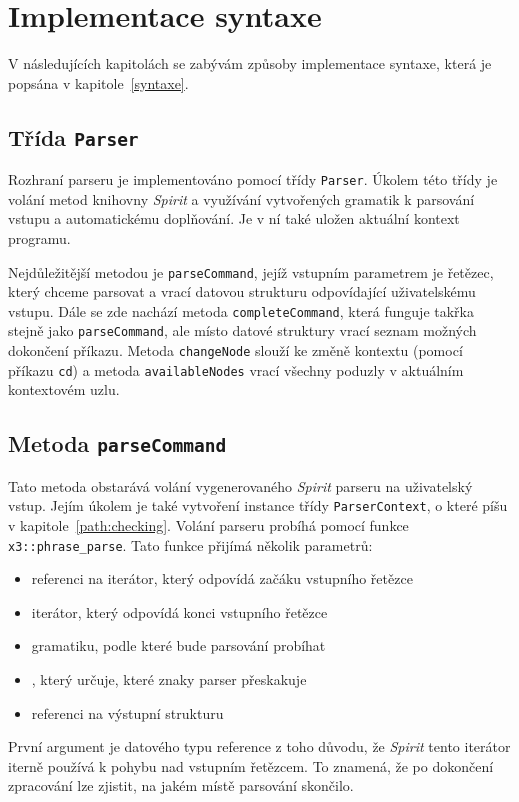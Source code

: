 \documentclass[thesis=B,czech,hidelinks]{FITthesis}[2019/03/06]
\begin{document}
\section{Implementace syntaxe}\label{syntax:impl}
V následujících kapitolách se zabývám způsoby implementace syntaxe, která je popsána v kapitole~\ref{syntaxe}.

\subsection{Třída \texttt{Parser}}
Rozhraní parseru je implementováno pomocí třídy \texttt{Parser}. Úkolem této třídy je volání metod knihovny \textit{Spirit} a využívání vytvořených gramatik k parsování vstupu a automatickému doplňování. Je v ní také uložen aktuální kontext programu.

Nejdůležitější metodou je \texttt{parseCommand}, jejíž vstupním parametrem je řetězec, který chceme parsovat a vrací datovou strukturu odpovídající uživatelskému vstupu. Dále se zde nachází metoda \texttt{completeCommand}, která funguje takřka stejně jako \texttt{parseCommand}, ale místo datové struktury vrací seznam možných dokončení příkazu. Metoda \texttt{changeNode} slouží ke změně kontextu (pomocí příkazu \texttt{cd}) a metoda \texttt{availableNodes} vrací všechny poduzly v aktuálním kontextovém uzlu.

\subsection{Metoda \texttt{parseCommand}}
Tato metoda obstarává volání vygenerovaného \textit{Spirit} parseru na uživatelský vstup. Jejím úkolem je také vytvoření instance třídy \texttt{ParserContext}, o které píšu v kapitole~\ref{path:checking}. Volání parseru probíhá pomocí funkce \texttt{x3::phrase\_parse}. Tato funkce přijímá několik parametrů:

\begin{itemize}
    \item referenci na iterátor, který odpovídá začáku vstupního řetězce
    \item iterátor, který odpovídá konci vstupního řetězce
    \item gramatiku, podle které bude parsování probíhat
    \item {}, který určuje, které znaky parser přeskakuje
    \item referenci na výstupní strukturu
\end{itemize}
První argument je datového typu reference z toho důvodu, že \textit{Spirit} tento iterátor iterně používá k pohybu nad vstupním řetězcem. To znamená, že po dokončení zpracování lze zjistit, na jakém místě parsování skončilo.
\end{document}
